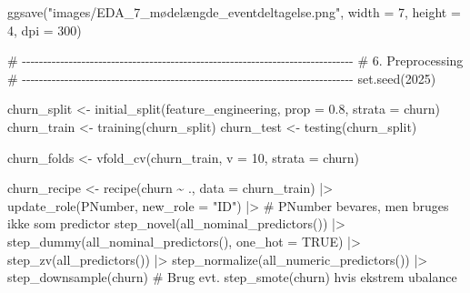 \documentclass[
  11pt,
  letterpaper,
  DIV=11,
  numbers=noendperiod]{scrartcl}
\newenvironment{Shaded}{\begin{snugshade}}{\end{snugshade}}
\newcommand{\AttributeTok}[1]{\textcolor[rgb]{0.40,0.45,0.13}{#1}}
\newcommand{\CommentTok}[1]{\textcolor[rgb]{0.37,0.37,0.37}{#1}}
\newcommand{\ConstantTok}[1]{\textcolor[rgb]{0.56,0.35,0.01}{#1}}
\newcommand{\DecValTok}[1]{\textcolor[rgb]{0.68,0.00,0.00}{#1}}
\newcommand{\FloatTok}[1]{\textcolor[rgb]{0.68,0.00,0.00}{#1}}
\newcommand{\FunctionTok}[1]{\textcolor[rgb]{0.28,0.35,0.67}{#1}}
\newcommand{\NormalTok}[1]{\textcolor[rgb]{0.00,0.23,0.31}{#1}}
\newcommand{\OtherTok}[1]{\textcolor[rgb]{0.00,0.23,0.31}{#1}}
\newcommand{\SpecialCharTok}[1]{\textcolor[rgb]{0.37,0.37,0.37}{#1}}
\newcommand{\StringTok}[1]{\textcolor[rgb]{0.13,0.47,0.30}{#1}}
\begin{document}
\begin{Shaded}
\begin{Highlighting}[]
\FunctionTok{ggsave}\NormalTok{(}\StringTok{"images/EDA\_7\_mødelængde\_eventdeltagelse.png"}\NormalTok{, }\AttributeTok{width =} \DecValTok{7}\NormalTok{, }\AttributeTok{height =} \DecValTok{4}\NormalTok{, }
       \AttributeTok{dpi =} \DecValTok{300}\NormalTok{)}
\end{Highlighting}
\end{Shaded}

\begin{Shaded}
\begin{Highlighting}[]
\CommentTok{\# {-}{-}{-}{-}{-}{-}{-}{-}{-}{-}{-}{-}{-}{-}{-}{-}{-}{-}{-}{-}{-}{-}{-}{-}{-}{-}{-}{-}{-}{-}{-}{-}{-}{-}{-}{-}{-}{-}{-}{-}{-}{-}{-}{-}{-}{-}{-}{-}{-}{-}{-}{-}{-}{-}{-}{-}{-}{-}{-}{-}{-}{-}{-}{-}{-}{-}{-}{-}{-}{-}{-}{-}{-}{-}{-}{-}{-}{-}}
\CommentTok{\# 6. Preprocessing}
\CommentTok{\# {-}{-}{-}{-}{-}{-}{-}{-}{-}{-}{-}{-}{-}{-}{-}{-}{-}{-}{-}{-}{-}{-}{-}{-}{-}{-}{-}{-}{-}{-}{-}{-}{-}{-}{-}{-}{-}{-}{-}{-}{-}{-}{-}{-}{-}{-}{-}{-}{-}{-}{-}{-}{-}{-}{-}{-}{-}{-}{-}{-}{-}{-}{-}{-}{-}{-}{-}{-}{-}{-}{-}{-}{-}{-}{-}{-}{-}{-}}
\FunctionTok{set.seed}\NormalTok{(}\DecValTok{2025}\NormalTok{)}

\NormalTok{churn\_split }\OtherTok{\textless{}{-}} \FunctionTok{initial\_split}\NormalTok{(feature\_engineering, }\AttributeTok{prop =} \FloatTok{0.8}\NormalTok{, }\AttributeTok{strata =}\NormalTok{ churn)}
\NormalTok{churn\_train }\OtherTok{\textless{}{-}} \FunctionTok{training}\NormalTok{(churn\_split)}
\NormalTok{churn\_test  }\OtherTok{\textless{}{-}} \FunctionTok{testing}\NormalTok{(churn\_split)}

\NormalTok{churn\_folds }\OtherTok{\textless{}{-}} \FunctionTok{vfold\_cv}\NormalTok{(churn\_train, }\AttributeTok{v =} \DecValTok{10}\NormalTok{, }\AttributeTok{strata =}\NormalTok{ churn)}

\NormalTok{churn\_recipe }\OtherTok{\textless{}{-}} 
  \FunctionTok{recipe}\NormalTok{(churn }\SpecialCharTok{\textasciitilde{}}\NormalTok{ ., }\AttributeTok{data =}\NormalTok{ churn\_train) }\SpecialCharTok{|\textgreater{}}
  \FunctionTok{update\_role}\NormalTok{(PNumber, }\AttributeTok{new\_role =} \StringTok{"ID"}\NormalTok{) }\SpecialCharTok{|\textgreater{}}  \CommentTok{\# PNumber bevares, men bruges ikke som predictor}
  \FunctionTok{step\_novel}\NormalTok{(}\FunctionTok{all\_nominal\_predictors}\NormalTok{()) }\SpecialCharTok{|\textgreater{}} 
  \FunctionTok{step\_dummy}\NormalTok{(}\FunctionTok{all\_nominal\_predictors}\NormalTok{(), }\AttributeTok{one\_hot =} \ConstantTok{TRUE}\NormalTok{) }\SpecialCharTok{|\textgreater{}}
  \FunctionTok{step\_zv}\NormalTok{(}\FunctionTok{all\_predictors}\NormalTok{()) }\SpecialCharTok{|\textgreater{}} 
  \FunctionTok{step\_normalize}\NormalTok{(}\FunctionTok{all\_numeric\_predictors}\NormalTok{()) }\SpecialCharTok{|\textgreater{}} 
  \FunctionTok{step\_downsample}\NormalTok{(churn)  }\CommentTok{\# Brug evt. step\_smote(churn) hvis ekstrem ubalance}
\end{Highlighting}
\end{Shaded}
\end{document}
